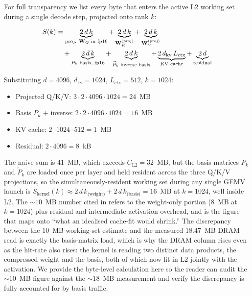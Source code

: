 \documentclass[11pt]{article}
\begin{document}
For full transparency we list every byte that enters the active L2
working set during a single decode step, projected onto rank $k$:

\begin{align}
S(k) &= \underbrace{2\,d\,k}_{\text{proj. }\mathbf{W}_Q\text{ in fp16}}
       + \underbrace{2\,d\,k}_{\mathbf{W}_K^{(\text{proj})}}
       + \underbrace{2\,d\,k}_{\mathbf{W}_V^{(\text{proj})}}\notag\\
     &\quad + \underbrace{2\,d\,k}_{P_k\text{ basis, fp16}}
       + \underbrace{2\,d\,k}_{\widetilde P_k\text{ inverse basis}}
       + \underbrace{2\,d_\text{kv}\,L_\text{ctx}}_{\text{KV cache}}
       + \underbrace{2\,d}_{\text{residual}} \label{eq:Sk}
\end{align}

Substituting $d{=}4096$, $d_\text{kv}{=}1024$, $L_\text{ctx}{=}512$,
$k{=}1024$:
\begin{itemize}
\item Projected Q/K/V: $3\cdot 2\cdot 4096\cdot 1024 = 24$~MB
\item Basis $P_k$ + inverse: $2\cdot 2\cdot 4096\cdot 1024 = 16$~MB
\item KV cache: $2\cdot 1024\cdot 512 = 1$~MB
\item Residual: $2\cdot 4096 = 8$~kB
\end{itemize}

The naive sum is $41$~MB, which exceeds $C_\text{L2}{=}32$~MB, but the
basis matrices $P_k$ and $\widetilde P_k$ are loaded once per layer and
held resident across the three Q/K/V projections, so the
simultaneously-resident working set during any single GEMV
launch is $S_\text{kernel}(k) \approx 2\,d\,k_\text{(weight)} +
2\,d\,k_\text{(basis)} = 16$~MB at $k{=}1024$, well inside L2. The
${\sim}10$~MB number cited in  refers to the
weight-only portion ($8$~MB at $k{=}1024$) plus residual and
intermediate activation overhead, and is the figure that maps onto
``what an idealised cache-fit would shrink.'' The discrepancy between
the $10$~MB working-set estimate and the measured $18.47$~MB DRAM read
is exactly the basis-matrix load, which is why the DRAM column rises
even as the hit-rate also rises: the kernel is reading two distinct
data products, the compressed weight and the basis, both of which now
fit in L2 jointly with the activation. We provide the byte-level
calculation here so the reader can audit the ${\sim}10$~MB figure
against the ${\sim}18$~MB measurement and verify the discrepancy is
fully accounted for by basis traffic.
\end{document}
